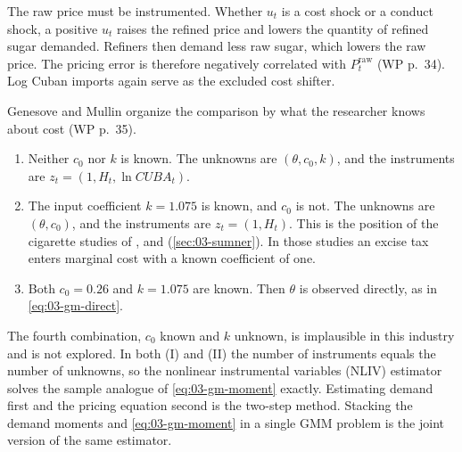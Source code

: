 The raw price must be instrumented. Whether $u_t$ is a cost shock or a conduct shock, a positive $u_t$ raises
the refined price and lowers the quantity of refined sugar demanded. Refiners then demand less raw sugar,
which lowers the raw price. The pricing error is therefore negatively correlated with $P^{\mathrm{raw}}_t$ (WP
p.~34). Log Cuban imports again serve as the excluded cost shifter.

Genesove and Mullin organize the comparison by what the researcher knows about cost (WP p.~35).
\begin{enumerate}[label=(\Roman*)]
\item Neither $c_0$ nor $k$ is known. The unknowns are $(\theta, c_0, k)$, and the instruments are
$z_t = (1, H_t, \ln\mathit{CUBA}_t)$.
\item The input coefficient $k = 1.075$ is known, and $c_0$ is not. The unknowns are $(\theta, c_0)$, and the
instruments are $z_t = (1, H_t)$. This is the position of the cigarette studies of \citet{Sumner1981},
\citet{Sullivan1985} and \citet{AshenfelterSullivan1987} (\cref{sec:03-sumner}). In those studies an excise
tax enters marginal cost with a known coefficient of one.
\item Both $c_0 = 0.26$ and $k = 1.075$ are known. Then $\theta$ is observed directly, as in
\eqref{eq:03-gm-direct}.
\end{enumerate}
The fourth combination, $c_0$ known and $k$ unknown, is implausible in this industry and is not explored. In
both (I) and (II) the number of instruments equals the number of unknowns, so the nonlinear instrumental
variables (NLIV) estimator solves the sample analogue of \eqref{eq:03-gm-moment} exactly. Estimating demand
first and the pricing equation second is the two-step method. Stacking the demand moments and
\eqref{eq:03-gm-moment} in a single GMM problem is the joint version of the same estimator.

